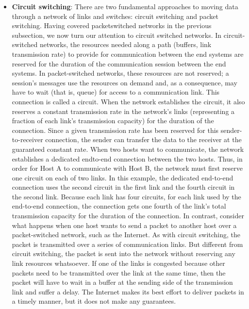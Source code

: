 \documentclass{report}
\begin{document}
\begin{itemize}
            \bigbreak \noindent 
            We’ll note for now that the Internet has a number of special routing protocols that are used to automatically set the forwarding tables. A routing protocol may, for example, determine the shortest path from each router to each destination and use the shortest path results to configure the forwarding tables in the routers.
        \item \textbf{Circuit switching}: There are two fundamental approaches to moving data through a network of links and switches: circuit switching and packet switching. Having covered packetswitched networks in the previous subsection, we now turn our attention to circuit switched networks.
            \bigbreak \noindent 
            In circuit-switched networks, the resources needed along a path (buffers, link transmission rate) to provide for communication between the end systems are reserved for the duration of the communication session between the end systems. In packet-switched networks, these resources are not reserved; a session’s messages use the resources on demand and, as a consequence, may have to wait (that is, queue) for access to a communication link.
            \bigbreak \noindent 
            This connection is called a circuit. When the network establishes the circuit, it also reserves a constant transmission rate in the network’s links (representing a fraction of each link’s transmission capacity) for the duration of the connection. Since a given transmission rate has been reserved for this sender-to-receiver connection, the sender can transfer the data to the receiver at the guaranteed constant rate.
            \bigbreak \noindent 
            When two hosts want to communicate, the network establishes a dedicated endto-end connection between the two hosts. Thus, in order for Host A to communicate with Host B, the network must first reserve one circuit on each of two links. In this example, the dedicated end-to-end connection uses the second circuit in the first link and the fourth circuit in the second link. Because each link has four circuits, for each link used by the end-to-end connection, the connection gets one fourth of the link’s total transmission capacity for the duration of the connection.
            \bigbreak \noindent 
            \bigbreak \noindent 
            In contrast, consider what happens when one host wants to send a packet to another host over a packet-switched network, such as the Internet. As with circuit switching, the packet is transmitted over a series of communication links. But different from circuit switching, the packet is sent into the network without reserving any link resources whatsoever. If one of the links is congested because other packets need to be transmitted over the link at the same time, then the packet will have to wait in a buffer at the sending side of the transmission link and suffer a delay. The Internet makes its best effort to deliver packets in a timely manner, but it does not make any guarantees.

\end{itemize}
\end{document}
